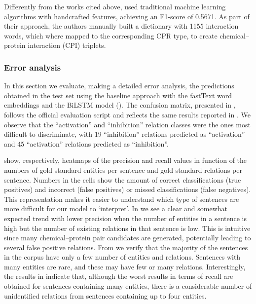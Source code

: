 Differently from the works cited above, \textcite{lung2019a} used traditional machine learning algorithms with handcrafted features, achieving an F1-score of 0.5671.
As part of their approach, the authors manually built a dictionary with 1155 interaction words, which where mapped to the corresponding CPR type, to create chemical--protein interaction (CPI) triplets.


\subsubsection{Error analysis}



In this section we evaluate, making a detailed error analysis, the predictions obtained in the test set using the baseline approach with the fastText word embeddings and the BiLSTM model ().
The confusion matrix, presented in , follows the official evaluation script and reflects the same results reported in .
We observe that the ``activation'' and ``inhibition'' relation classes were the ones most difficult to discriminate, with 19 ``inhibition'' relations predicted as ``activation'' and 45 ``activation'' relations predicted as ``inhibition''.

 show, respectively, heatmaps of the precision and recall values in function of the numbers of gold-standard entities per sentence and gold-standard relations per sentence.
Numbers in the cells show the amount of correct classifications (true positives) and incorrect (false positives) or missed classifications (false negatives).
This representation makes it easier to understand which type of sentences are more difficult for our model to `interpret'.
In  we see a clear and somewhat expected trend with lower precision when the number of entities in a sentence is high but the number of existing relations in that sentence is low.
This is intuitive since many chemical--protein pair candidates are generated, potentially leading to several false positive relations.
From  we verify that the majority of the sentences in the corpus have only a few number of entities and relations.
Sentences with many entities are rare, and these may have few or many relations.
Interestingly, the results in  indicate that, although the worst results in terms of recall are obtained for sentences containing many entities, there is a considerable number of unidentified relations from sentences containing up to four entities.

